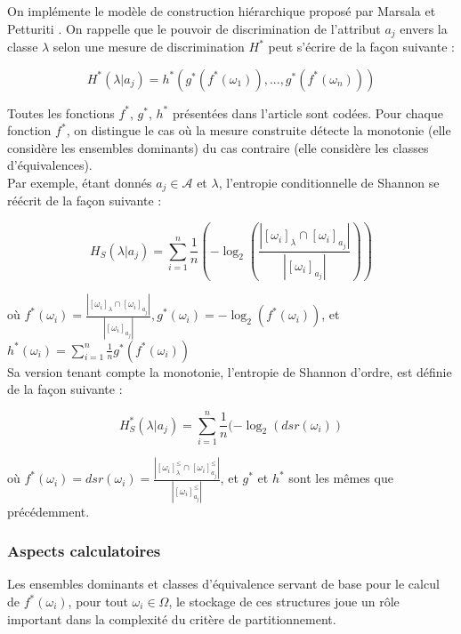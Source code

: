 \documentclass[a4paper]{article}
\begin{document}
On implémente le modèle de construction hiérarchique proposé par Marsala et
Petturiti \cite{marsala-rank}. On rappelle que le pouvoir de discrimination de
l'attribut $a_j$ envers la classe $\lambda$ selon une mesure de discrimination
$H^*$ peut s'écrire de la façon suivante :

$$ H^*(\lambda | a_j) = h^*(g^*(f^*(\omega_1)),...,g^*(f^*(\omega_n)))$$

\noindent Toutes les fonctions $f^*$, $g^*$, $h^*$ présentées dans l'article
sont codées.  Pour chaque fonction $f^*$, on distingue le cas où la mesure
construite détecte la monotonie (elle considère les ensembles dominants) du
cas contraire (elle considère les classes d'équivalences). \\

Par exemple, étant donnés $a_j \in \mathcal{A}$ et $\lambda$, l'entropie
conditionnelle de Shannon se réécrit de la façon suivante :

\begin{equation}
    H_S(\lambda | a_j) = \sum_{i=1}^{n} \frac{1}{n} (-\log_{2}
    (\frac{|[\omega_i]_{\lambda} \cap [\omega_i]_{a_j}|}{|[\omega_i]_{a_j}|}))
\label{eq:shannon}
\end{equation}


où $f^*(\omega_i) = \frac{|[\omega_i]_{\lambda} \cap
[\omega_i]_{a_j}|}{|[\omega_i]_{a_j}|}, g^*(\omega_i) = -\log_{2}
(f^*(\omega_i))$, et $h^*(\omega_i) = \sum_{i=1}^{n} \frac{1}{n}
g^*(f^*(\omega_i))$ \\

Sa version tenant compte la monotonie, l'entropie de Shannon d'ordre, est
définie de la façon suivante :

$$ H^*_S(\lambda | a_j) = \sum_{i=1}^{n} \frac{1}{n} (-\log_{2} (dsr(\omega_i))$$

où $f^*(\omega_i) = dsr(\omega_i) = \frac{|[\omega_i]^{\leq}_{\lambda} \cap
[\omega_i]^{\leq}_{a_j}|}{|[\omega_i]^{\leq}_{a_j}|}$, et $g^*$ et $h^*$ sont
les mêmes que précédemment. \\

\subsubsection{Aspects calculatoires}

Les ensembles dominants et classes d'équivalence servant de base pour le calcul
de $f^*(\omega_i)$, pour tout $\omega_i \in \Omega$, le stockage de ces
structures joue un rôle important dans la complexité du critère de
partitionnement.
\end{document}
